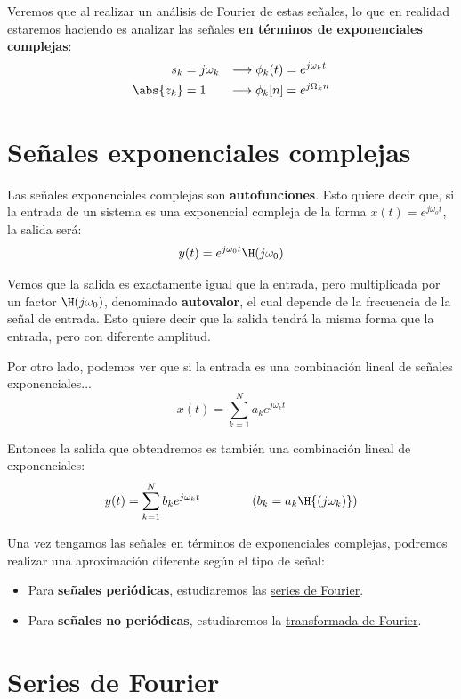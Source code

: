 \documentclass[a4paper]{book}
\begin{document}
Veremos que al realizar un análisis de Fourier de estas señales, lo que en realidad estaremos haciendo es analizar las señales \textbf{en términos de exponenciales complejas}:
\begin{align*}
	 &  &  &  &  &  &  &  & s_k       & = j\omega_k & \longrightarrow  \phi_k(t) & = e^{j\omega_kt} &  &  &  &  &  &  &  & \\
	 &  &  &  &  &  &  &  & \abs{z_k} & = 1         & \longrightarrow  \phi_k[n] & = e^{j\Omega_kn} &  &  &  &  &  &  &  &
\end{align*}

\section{Señales exponenciales complejas}
Las señales exponenciales complejas son \textbf{autofunciones}. Esto quiere decir que, si la entrada de un sistema es una exponencial compleja de la forma $x(t) = e^{j\omega_ot}$, la salida será: \[y(t) = e^{j \omega _0 t} \H (j\omega _0)\]

Vemos que la salida es exactamente igual que la entrada, pero multiplicada por un factor $\H (j\omega _0)$, denominado \textbf{autovalor}, el cual depende de la frecuencia de la señal de entrada. Esto quiere decir que la salida tendrá la misma forma que la entrada, pero con diferente amplitud.

Por otro lado, podemos ver que si la entrada es una combinación lineal de señales exponenciales... \[x(t) = \sum^{N}_{k=1}{a_ke^{j\omega _kt}}\]

Entonces la salida que obtendremos es también una combinación lineal de exponenciales: \[y(t) = \sum^{N}_{k=1}{b_ke^{j\omega _kt}} \qquad \qquad \left( b_k = a_k \H{\left( j\omega _k \right)} \right)\]

Una vez tengamos las señales en términos de exponenciales complejas, podremos realizar una aproximación diferente según el tipo de señal:
\begin{itemize}
	\item Para \textbf{señales periódicas}, estudiaremos las \hyperref[sec:Series_de_Fourier]{series de Fourier}.
	\item Para \textbf{señales no periódicas}, estudiaremos la \hyperref[sec:Transformada_de_Fourier]{transformada de Fourier}.
\end{itemize}


\section{Series de Fourier} \label{sec:Series_de_Fourier}
\end{document}
